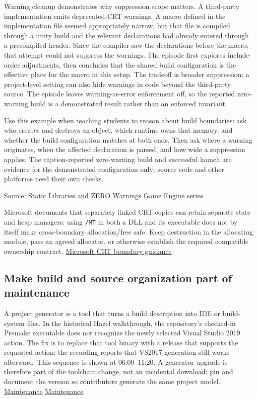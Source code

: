 Warning cleanup demonstrates why suppression scope matters. A third-party implementation emits deprecated-CRT warnings. A macro defined in the implementation file seemed appropriately narrow, but that file is compiled through a unity build and the relevant declarations had already entered through a precompiled header. Since the compiler saw the declarations before the macro, that attempt could not suppress the warnings. The episode first explores include-order adjustments, then concludes that the shared build configuration is the effective place for the macro in this setup. The tradeoff is broader suppression: a project-level setting can also hide warnings in code beyond the third-party source. The episode leaves warning-as-error enforcement off, so the reported zero-warning build is a demonstrated result rather than an enforced invariant.

Use this example when teaching students to reason about build boundaries: ask who creates and destroys an object, which runtime owns that memory, and whether the build configuration matches at both ends. Then ask where a warning originates, when the affected declaration is parsed, and how wide a suppression applies. The caption-reported zero-warning build and successful launch are evidence for the demonstrated configuration only; source code and other platforms need their own checks.

Source: \href{https://www.youtube.com/watch?v=TlvmnoDlrI0}{Static Libraries and ZERO Warnings \textbar{} Game Engine series}

Microsoft documents that separately linked CRT copies can retain separate state and heap managers: using \texttt{/MT} in both a DLL and its executable does not by itself make cross-boundary allocation/free safe. Keep destruction in the allocating module, pass an agreed allocator, or otherwise establish the required compatible ownership contract. \href{https://learn.microsoft.com/en-us/cpp/c-runtime-library/potential-errors-passing-crt-objects-across-dll-boundaries?view=msvc-170}{Microsoft CRT boundary guidance}

\subsection{Make build and source organization part of maintenance}\label{05-engine-i-ch013-make-build-and-source-organization-part-of-maintenance}

A project generator is a tool that turns a build description into IDE or build-system files. In the historical Hazel walkthrough, the repository's checked-in Premake executable does not recognize the newly selected Visual Studio 2019 action. The fix is to replace that tool binary with a release that supports the requested action; the recording reports that VS2017 generation still works afterward. This sequence is shown at 06:00--11:20. A generator upgrade is therefore part of the toolchain change, not an incidental download: pin and document the version so contributors generate the same project model. \href{https://www.youtube.com/watch?v=e9uTV44oOiw&t=360s}{Maintenance} \href{https://www.youtube.com/watch?v=e9uTV44oOiw&t=600s}{Maintenance}

